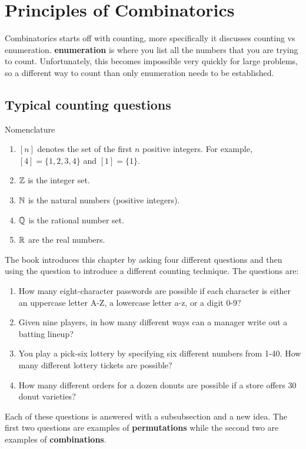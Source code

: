\documentclass{article}
\begin{document}
\section{Principles of Combinatorics}

Combinatorics starts off with counting, more specifically it discusses counting vs enumeration. \textbf{enumeration} is where you list all the numbers that you are trying to count. Unfortunately, this becomes impossible very quickly for large problems, so a different way to count than only enumeration needs to be established.

\subsection{Typical counting questions}

Nomenclature
\begin{enumerate}
    \item $[n]$ denotes the set of the first $n$ positive integers. For example, $[4] = \{1, 2, 3, 4\}$ and $[1] = \{1\}$.
    \item $\mathbb Z$ is the integer set.
    \item $\mathbb N$ is the natural numbers (positive integers).
    \item $\mathbb Q$ is the rational number set.
    \item $\mathbb R$ are the real numbers.
\end{enumerate}

The book introduces this chapter by asking four different questions and then using the question to introduce a different counting technique. The questions are:

\begin{enumerate}
    \item How many eight-character passwords are possible if each character is either an uppercase letter A-Z, a lowercase letter a-z, or a digit 0-9?
    \item Given nine players, in how many different ways can a manager write out a batting lineup?
    \item You play a pick-six lottery by specifying six different numbers from 1-40. How many different lottery tickets are possible?
    \item How many different orders for a dozen donuts are possible if a store offers 30 donut varieties?
\end{enumerate}

Each of these questions is answered with a subsubsection and a new idea. The first two questions are examples of \textbf{permutations} while the second two are examples of \textbf{combinations}.
\end{document}
